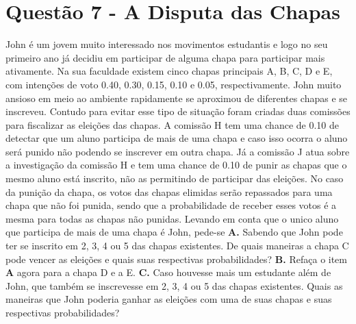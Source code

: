 \documentclass[a4paper, 12pt]{article}
\begin{document}
\section*{Questão 7 - A Disputa das Chapas}
\large {John é um jovem muito interessado nos movimentos estudantis e logo no seu primeiro ano já decidiu em participar de alguma chapa para participar mais ativamente. Na sua faculdade existem cinco chapas principais A, B, C, D e E, com intenções de voto 0.40, 0.30, 0.15, 0.10 e 0.05, respectivamente. John muito ansioso em meio ao ambiente rapidamente se aproximou de diferentes chapas e se inscreveu. 
\newline
Contudo para evitar esse tipo de situação foram criadas duas comissões para fiscalizar as eleições das chapas. A comissão H tem uma chance de 0.10 de detectar que um aluno participa de mais de uma chapa e caso isso ocorra o aluno será punido não podendo se inscrever em outra chapa. Já a comissão J atua sobre a investigação da comissão H e tem uma chance de 0.10 de punir as chapas que o mesmo aluno está inscrito, não as permitindo de participar das eleições.
\newline
No caso da punição da chapa, os votos das chapas elimidas serão repassados para uma chapa que não foi punida, sendo que a probabilidade de receber esses votos é a mesma para todas as chapas não punidas. Levando em conta que o unico aluno que participa de mais de uma chapa é John, pede-se}
\newline
\newline
\textbf{A.}  Sabendo que John pode ter se inscrito em 2, 3, 4 ou 5 das chapas existentes. De quais maneiras a chapa C pode vencer as eleições e quais suas respectivas probabilidades?
\newline
\newline
\textbf{B.} Refaça o item \textbf{A} agora para a chapa D e a E.
\newline
\newline
\textbf{C.} Caso houvesse mais um estudante além de John, que também se inscrevesse em 2, 3, 4 ou 5 das chapas existentes. Quais as maneiras que John poderia ganhar as eleições com uma de suas chapas e suas respectivas probabilidades?
\end{document}
